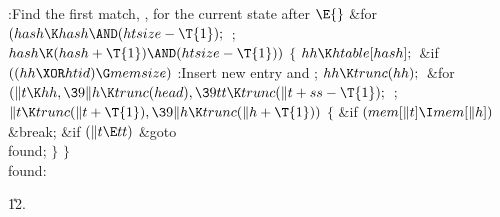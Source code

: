 \Y\B\4:Find the first match, , for the current state after \X${}\E{}$\6
\&{for} ${}(\\{hash}\K\\{hash}\AND(\\{htsize}-\T{1});{}$  ; ${}\\{hash}\K(%
\\{hash}+\T{1})\AND(\\{htsize}-\T{1})){}$\5
${}\{{}$\1\6
${}\\{hh}\K\\{htable}[\\{hash}];{}$\6
\&{if} ${}((\\{hh}\XOR\\{htid})\G\\{memsize}){}$\1\5
:Insert new entry and \X;\2\6
${}\\{hh}\K\\{trunc}(\\{hh});{}$\6
\&{for} ${}(\|t\K\\{hh},\39\|h\K\\{trunc}(\\{head}),\39\\{tt}\K\\{trunc}(\|t+%
\\{ss}-\T{1});{}$  ; ${}\|t\K\\{trunc}(\|t+\T{1}),\39\|h\K\\{trunc}(\|h+%
\T{1})){}$\5
${}\{{}$\1\6
\&{if} ${}(\\{mem}[\|t]\I\\{mem}[\|h]){}$\1\5
\&{break};\2\6
\&{if} ${}(\|t\E\\{tt}){}$\1\5
\&{goto} \\{found};\2\6
\4${}\}{}$\2\6
\4${}\}{}$\2\6
\\{found}:\par
\U12.\fi

